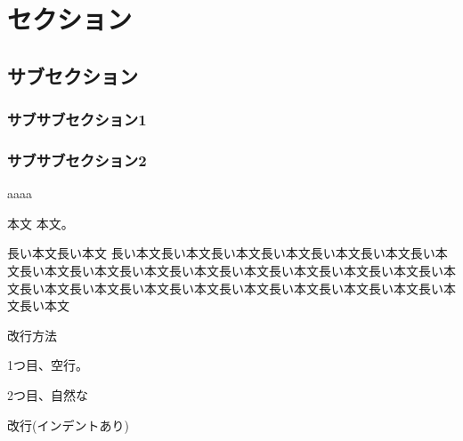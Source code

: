 \documentclass[11pt]{jsarticle} %
\begin{document}

\rhead{}
\cfoot{}%

\setcounter{section}{0} %
\setcounter{subsection}{0} %
\setcounter{subsubsection}{0} %
\setcounter{equation}{0} %
\setcounter{figure}{0} %
\setcounter{table}{0} %



\section{セクション}
\subsection{サブセクション}
\subsubsection{サブサブセクション1}
\subsubsection{サブサブセクション2}
aaaa %

本文 本文。
\begin{comment}
	複数行の
	コメント
\end{comment}

長い本文長い本文
長い本文長い本文長い本文長い本文長い本文長い本文長い本文長い本文長い本文長い本文長い本文長い本文長い本文長い本文長い本文長い本文長い本文長い本文長い本文長い本文長い本文長い本文長い本文長い本文長い本文長い本文

改行方法

1つ目、空行。

2つ目、自然な\par 改行(インデントあり)
\end{document}
